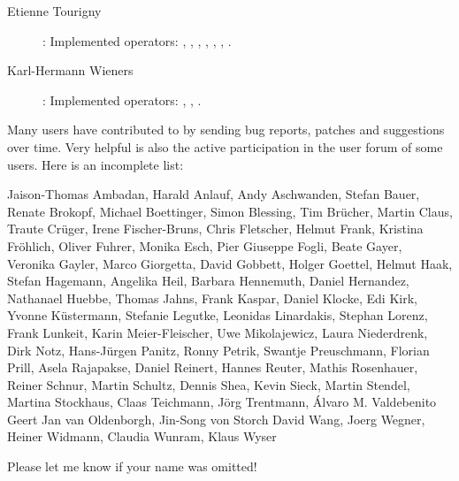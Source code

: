 \begin{description}
\item[Etienne Tourigny]: Implemented operators:  {}, {},
 {}, {}, {}, {}, {}.

\item[Karl-Hermann Wieners]: Implemented operators: {},  {},  {}.
\end{description}







Many users have contributed to {\CDO} by sending bug reports, patches
and suggestions over time.
Very helpful is also the active participation in the user forum of some users.
Here is an incomplete list:

Jaison-Thomas Ambadan,
Harald Anlauf,
Andy Aschwanden,
Stefan Bauer,
Renate Brokopf,
Michael Boettinger,
Simon Blessing,
Tim Br\"ucher,
Martin Claus,
Traute Cr\"uger,
Irene Fischer-Bruns,
Chris Fletscher,
Helmut Frank,
Kristina Fr\"ohlich,
Oliver Fuhrer,
Monika Esch,
Pier Giuseppe Fogli,
Beate Gayer,
Veronika Gayler,
Marco Giorgetta,
David Gobbett,
Holger Goettel,
Helmut Haak,
Stefan Hagemann,
Angelika Heil,
Barbara Hennemuth,
Daniel Hernandez,
Nathanael Huebbe,
Thomas Jahns,
Frank Kaspar,
Daniel Klocke,
Edi Kirk,
Yvonne K\"ustermann,
Stefanie Legutke,
Leonidas Linardakis,
Stephan Lorenz,
Frank Lunkeit,
Karin Meier-Fleischer,
Uwe Mikolajewicz,
Laura Niederdrenk,
Dirk Notz,
Hans-J\"urgen Panitz,
Ronny Petrik,
Swantje Preuschmann,
Florian Prill,
Asela Rajapakse,
Daniel Reinert,
Hannes Reuter,
Mathis Rosenhauer,
Reiner Schnur,
Martin Schultz,
Dennis Shea,
Kevin Sieck,
Martin Stendel,
Martina Stockhaus,
Claas Teichmann,
J\"org Trentmann,
\'Alvaro M. Valdebenito
Geert Jan van Oldenborgh,
Jin-Song von Storch
David Wang,
Joerg Wegner,
Heiner Widmann,
Claudia Wunram,
Klaus Wyser

Please let me know if your name was omitted!
